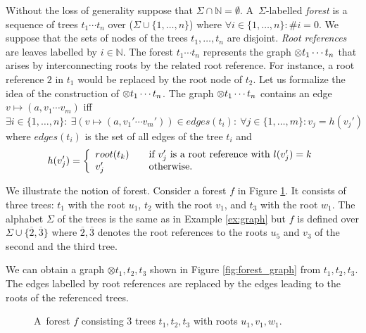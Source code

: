 Without the loss of generality suppose that $\Sigma \cap \mathbb{N} = \emptyset$.
A~$\Sigma$-labelled \emph{forest} is a sequence of trees $t_1 \cdots t_n$ over ($\Sigma \cup \{1,\ldots,n\}$)
where $\forall i \in \{1,\ldots,n\}: \#i = 0$.
We suppose that the sets of nodes of the trees $t_1, \ldots, t_n$ are disjoint.
\emph{Root references} are leaves labelled by $i \in \mathbb{N}$.
The forest $t_1 \cdots t_n$ represents the graph $\otimes t_1 \cdots t_n$ that arises
by interconnecting roots by the related root reference.
For instance, a root reference $2$ in $t_1$ would be replaced by the root node of $t_2$.
Let us formalize the idea of the construction of $\otimes t_1 \cdots t_n$.
The graph $\otimes t_1 \cdots t_n$ contains an edge $v \mapsto (a,v_1 \cdots v_m)$ iff $\exists i \in \{1, \ldots, n\}:\ \exists(v \mapsto (a, v_1' \cdots v_m')) \in edges(t_i):
\ \forall j \in \{1,\ldots,m\}: v_j = h(v_j')$ where $edges(t_i)$ is the set of all edges of the tree $t_i$ and
\[ h(v_j') = \left\{
  \begin{array}{l l}
  root(t_k) & \quad \text{if $v_j'$ is a root reference with $l(v_j') = k$}\\
  v_j'   & \quad \text{otherwise.}
  \end{array} \right.\]

\pagebreak
\bexmp
We illustrate the notion of forest.
Consider a forest $f$ in Figure \ref{fig:forest}.
It consists of three trees: $t_1$ with the root $u_1$,
$t_2$ with the root $v_1$, and $t_3$ with the root $w_1$.
The alphabet $\Sigma$ of the trees is the same as in Example \ref{ex:graph} but $f$
is defined over $\Sigma \cup \{\overline{2}, \overline{3}\}$
where $\overline{2}, \overline{3}$ denotes the root references
to the roots $u_5$ and $v_3$ of the second and the third tree.

We can obtain a graph $\otimes t_1,t_2,t_3$ shown in Figure \ref{fig:forest_graph} from $t_1, t_2, t_3$.
The edges labelled by root references are replaced by the edges leading to the roots
of the referenced trees.
	\begin{figure}[bth]
	\begin{center}
		\scalebox{1}
		{
			
			\hspace{0.55cm}
			
			\hspace{0.55cm}
			
		}
		\caption{A~forest $f$ consisting 3 trees $t_1, t_2, t_3$ with roots $u_1, v_1, w_1$.}
	  \label{fig:forest}
	\end{center}
	\end{figure}


